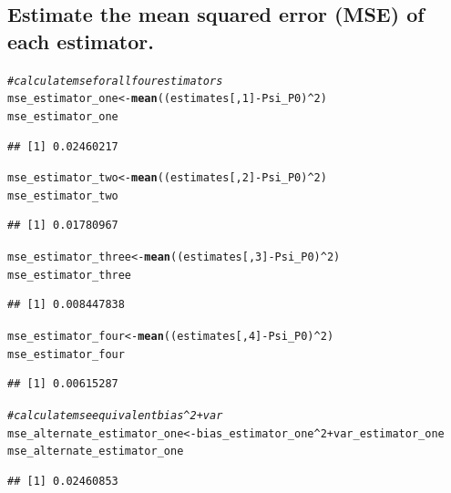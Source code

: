 \documentclass{article}\usepackage[]{graphicx}\usepackage[]{xcolor}
\makeatletter
\newcommand{\hlnum}[1]{\textcolor[rgb]{0.686,0.059,0.569}{#1}}%
\newcommand{\hlcom}[1]{\textcolor[rgb]{0.678,0.584,0.686}{\textit{#1}}}%
\newcommand{\hlopt}[1]{\textcolor[rgb]{0,0,0}{#1}}%
\newcommand{\hlstd}[1]{\textcolor[rgb]{0.345,0.345,0.345}{#1}}%
\newcommand{\hlkwb}[1]{\textcolor[rgb]{0.69,0.353,0.396}{#1}}%
\newcommand{\hlkwd}[1]{\textcolor[rgb]{0.737,0.353,0.396}{\textbf{#1}}}%
\newenvironment{kframe}{%
 \def\at@end@of@kframe{}%
 \ifinner\ifhmode%
  \def\at@end@of@kframe{\end{minipage}}%
  \begin{minipage}{\columnwidth}%
 \fi\fi%
 \def\FrameCommand##1{\hskip\@totalleftmargin \hskip-\fboxsep
 \colorbox{shadecolor}{##1}\hskip-\fboxsep
     \hskip-\linewidth \hskip-\@totalleftmargin \hskip\columnwidth}%
 \MakeFramed {\advance\hsize-\width
   \@totalleftmargin\z@ \linewidth\hsize
   \@setminipage}}%
 {\par\unskip\endMakeFramed%
 \at@end@of@kframe}
\newenvironment{knitrout}{}{} %
\makeatother
\begin{document}
  \subsection{Estimate the mean squared error (MSE) of each estimator.}
  
\begin{knitrout}
\color{fgcolor}\begin{kframe}
\begin{alltt}
\hlcom{# calculate mse for all four estimators}
\hlstd{mse_estimator_one} \hlkwb{<-} \hlkwd{mean}\hlstd{((estimates[,}\hlnum{1}\hlstd{]} \hlopt{-} \hlstd{Psi_P0)}\hlopt{^}\hlnum{2}\hlstd{)}
\hlstd{mse_estimator_one}
\end{alltt}
\begin{verbatim}
## [1] 0.02460217
\end{verbatim}
\begin{alltt}
\hlstd{mse_estimator_two} \hlkwb{<-} \hlkwd{mean}\hlstd{((estimates[,}\hlnum{2}\hlstd{]} \hlopt{-} \hlstd{Psi_P0)}\hlopt{^}\hlnum{2}\hlstd{)}
\hlstd{mse_estimator_two}
\end{alltt}
\begin{verbatim}
## [1] 0.01780967
\end{verbatim}
\begin{alltt}
\hlstd{mse_estimator_three} \hlkwb{<-} \hlkwd{mean}\hlstd{((estimates[,}\hlnum{3}\hlstd{]} \hlopt{-} \hlstd{Psi_P0)}\hlopt{^}\hlnum{2}\hlstd{)}
\hlstd{mse_estimator_three}
\end{alltt}
\begin{verbatim}
## [1] 0.008447838
\end{verbatim}
\begin{alltt}
\hlstd{mse_estimator_four} \hlkwb{<-} \hlkwd{mean}\hlstd{((estimates[,}\hlnum{4}\hlstd{]} \hlopt{-} \hlstd{Psi_P0)}\hlopt{^}\hlnum{2}\hlstd{)}
\hlstd{mse_estimator_four}
\end{alltt}
\begin{verbatim}
## [1] 0.00615287
\end{verbatim}
\begin{alltt}
\hlcom{# calculate mse equivalent bias^2 + var}
\hlstd{mse_alternate_estimator_one} \hlkwb{<-} \hlstd{bias_estimator_one}\hlopt{^}\hlnum{2} \hlopt{+} \hlstd{var_estimator_one}
\hlstd{mse_alternate_estimator_one}
\end{alltt}
\begin{verbatim}
## [1] 0.02460853
\end{verbatim}
\begin{alltt}

\end{alltt}
\end{kframe}
\end{knitrout}
\end{document}
